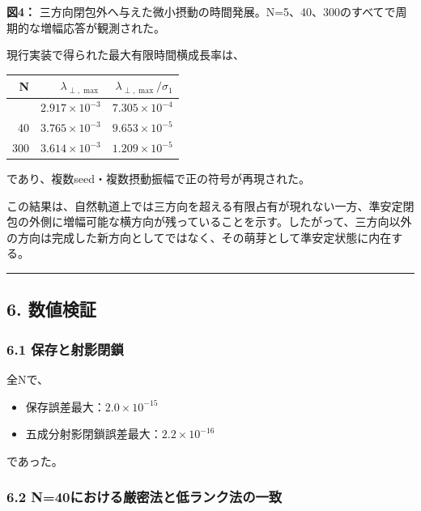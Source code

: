 \documentclass[
  a4paper,
]{ltjsarticle}
\newcounter{none} %
\providecommand{\tightlist}{%
  \setlength{\itemsep}{0pt}\setlength{\parskip}{0pt}}
\begin{document}
\textbf{図4：}
三方向閉包外へ与えた微小摂動の時間発展。N=5、40、300のすべてで周期的な増幅応答が観測された。

現行実装で得られた最大有限時間横成長率は、

{\def\LTcaptype{none} %
\begin{longtable}[]{@{}rrr@{}}
\toprule\noalign{}
N & \(\lambda_{\perp,\max}\) & \(\lambda_{\perp,\max}/\sigma_1\) \\
\midrule\noalign{}
\endhead
\bottomrule\noalign{}
\endlastfoot
5 & \(2.917\times10^{-3}\) & \(7.305\times10^{-4}\) \\
40 & \(3.765\times10^{-3}\) & \(9.653\times10^{-5}\) \\
300 & \(3.614\times10^{-3}\) & \(1.209\times10^{-5}\) \\
\end{longtable}
}

であり、複数seed・複数摂動振幅で正の符号が再現された。

この結果は、自然軌道上では三方向を超える有限占有が現れない一方、準安定閉包の外側に増幅可能な横方向が残っていることを示す。したがって、三方向以外の方向は完成した新方向としてではなく、その萌芽として準安定状態に内在する。

\begin{center}\rule{0.5\linewidth}{0.5pt}\end{center}

\subsection{6. 数値検証}\label{ux6570ux5024ux691cux8a3c}

\subsubsection{6.1
保存と射影閉鎖}\label{ux4fddux5b58ux3068ux5c04ux5f71ux9589ux9396}

全Nで、

\begin{itemize}
\tightlist
\item
  保存誤差最大：\(2.0\times10^{-15}\)
\item
  五成分射影閉鎖誤差最大：\(2.2\times10^{-16}\)
\end{itemize}

であった。

\subsubsection{6.2
N=40における厳密法と低ランク法の一致}\label{n40ux306bux304aux3051ux308bux53b3ux5bc6ux6cd5ux3068ux4f4eux30e9ux30f3ux30afux6cd5ux306eux4e00ux81f4}
\end{document}
